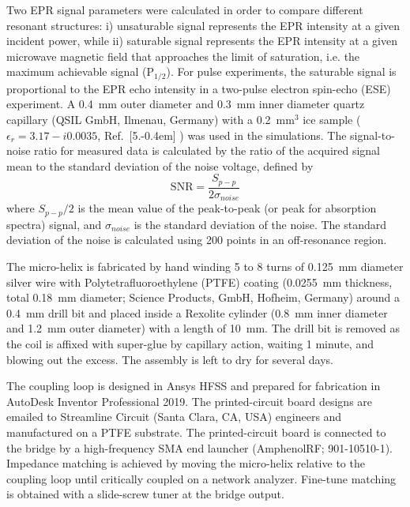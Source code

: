 Two EPR signal parameters were calculated in order to compare different resonant structures: i) unsaturable signal represents the EPR intensity at a given incident power, while ii) saturable signal represents the EPR intensity at a given microwave magnetic field that approaches the limit of saturation, i.e. the maximum achievable signal (P$_{1/2}$). For pulse experiments, the saturable signal is proportional to the EPR echo intensity in a two-pulse electron spin-echo (ESE) experiment. A 0.4~mm outer diameter and 0.3~mm inner diameter quartz capillary (QSIL GmbH, Ilmenau, Germany) with a 0.2~mm$^3$ ice sample ($\epsilon_r=3.17-i0.0035$, Ref.~[5.\kern-0.4em] ) was used in the simulations. The signal-to-noise ratio for measured data is calculated by the ratio of the acquired signal mean to the standard deviation of the noise voltage, defined by
\begin{equation}
 \text{SNR}=\frac{S_{p\!-\!p}}{2\sigma_{noise}}
\end{equation}
where $S_{p\!-\!p}/2$ is the mean value of the peak-to-peak (or peak for absorption spectra) signal, and $\sigma_{noise}$ is the standard deviation of the noise. \cite{schroeder2000astronomical, oppenheim1999discrete} The standard deviation of the noise is calculated using 200 points in an off-resonance region.

The micro-helix is fabricated by hand winding 5 to 8 turns of 0.125~mm diameter silver wire with Polytetrafluoroethylene (PTFE) coating (0.0255~mm thickness, total 0.18~mm diameter; Science Products, GmbH, Hofheim, Germany) around a 0.4~mm drill bit and placed inside a Rexolite cylinder (0.8~mm inner diameter and 1.2~mm outer diameter) with a length of 10~mm. The drill bit is removed as the coil is affixed with super-glue by capillary action, waiting 1 minute, and blowing out the excess. The assembly is left to dry for several days. 

The coupling loop is designed in Ansys HFSS and prepared for fabrication in AutoDesk Inventor Professional 2019. The printed-circuit board designs are emailed to Streamline Circuit (Santa Clara, CA, USA) engineers and manufactured on a PTFE substrate. The printed-circuit board is connected to the bridge by a high-frequency SMA end launcher (AmphenolRF; 901-10510-1). Impedance matching is achieved by moving the micro-helix relative to the coupling loop until critically coupled on a network analyzer. Fine-tune matching is obtained with a slide-screw tuner at the bridge output. 

